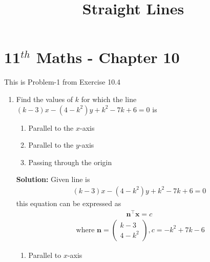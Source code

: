 \documentclass[12pt]{article}
\newcommand{\solution}{\noindent \textbf{Solution: }}
\newcommand{\myvec}[1]{\ensuremath{\begin{pmatrix}#1\end{pmatrix}}}
\let\vec\mathbf
\begin{document}
\begin{center}
\enlargethispage{-4cm}
\title{\textbf{Straight Lines}}
\date{\vspace{-5ex}} %
\maketitle
\end{center}
\setcounter{page}{1}
\section*{11$^{th}$ Maths - Chapter 10}
This is Problem-1 from Exercise 10.4
\begin{enumerate}
\item Find the values of $k$ for which the line $(k-3)x-(4-k^2)y+k^2-7k+6=0$ is
\begin{enumerate}
\item Parallel to the $x$-axis
\item Parallel to the $y$-axis
\item Passing through the origin
\end{enumerate}

\solution
Given line is
\begin{align}
(k-3)x-(4-k^2)y+k^2-7k+6=0 \label{eq:1}
\end{align}
this equation can be expressed as
\begin{align}
\vec{n}^{\top}\vec{x}=c \label{eq:2}
\end{align}
\begin{align}
\text{ where }
\vec{n} = \myvec{k-3\\4-k^2} , c = -k^2+7k-6
\end{align}
\begin{enumerate}
    \item Parallel to $x$-axis


\end{enumerate}
\end{enumerate}
\end{document}
